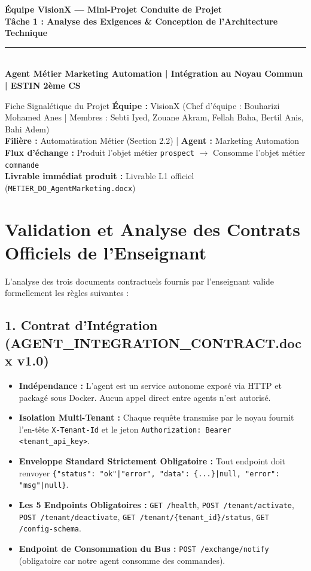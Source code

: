 \documentclass[11pt,a4paper]{article}
\begin{document}
\begin{center}
    {\LARGE \textbf{\color{primary}Équipe VisionX — Mini-Projet Conduite de Projet}}\\[0.15cm]
    {\large \textbf{\color{secondary}Tâche 1 : Analyse des Exigences \& Conception de l'Architecture Technique}}\\[0.2cm]
    \rule{0.85\textwidth}{0.8pt}\\[0.15cm]
    {\footnotesize \textbf{Agent Métier Marketing Automation | Intégration au Noyau Commun | ESTIN 2ème CS}}
\end{center}
\vspace{-0.2cm}

\begin{infobox}{Fiche Signalétique du Projet}
\textbf{Équipe :} VisionX (Chef d'équipe : Bouharizi Mohamed Anes | Membres : Sebti Iyed, Zouane Akram, Fellah Baha, Bertil Anis, Bahi Adem)\\
\textbf{Filière :} Automatisation Métier (Section 2.2) | \textbf{Agent :} Marketing Automation\\
\textbf{Flux d'échange :} Produit l'objet métier \texttt{prospect} $\longrightarrow$ Consomme l'objet métier \texttt{commande}\\
\textbf{Livrable immédiat produit :} Livrable L1 officiel (\texttt{METIER\_DO\_AgentMarketing.docx})
\end{infobox}

\section{Validation et Analyse des Contrats Officiels de l'Enseignant}
L'analyse des trois documents contractuels fournis par l'enseignant valide formellement les règles suivantes :

\subsection{1. Contrat d'Intégration (AGENT\_INTEGRATION\_CONTRACT.docx v1.0)}
\begin{itemize}[leftmargin=*, itemsep=1.5pt]
    \item \textbf{Indépendance :} L'agent est un service autonome exposé via HTTP et packagé sous Docker. Aucun appel direct entre agents n'est autorisé.
    \item \textbf{Isolation Multi-Tenant :} Chaque requête transmise par le noyau fournit l'en-tête \texttt{X-Tenant-Id} et le jeton \texttt{Authorization: Bearer <tenant\_api\_key>}.
    \item \textbf{Enveloppe Standard Strictement Obligatoire :} Tout endpoint doit renvoyer \texttt{\{"status": "ok"|"error", "data": \{...\}|null, "error": "msg"|null\}}.
    \item \textbf{Les 5 Endpoints Obligatoires :} \texttt{GET /health}, \texttt{POST /tenant/activate}, \texttt{POST /tenant/deactivate}, \texttt{GET /tenant/\{tenant\_id\}/status}, \texttt{GET /config-schema}.
    \item \textbf{Endpoint de Consommation du Bus :} \texttt{POST /exchange/notify} (obligatoire car notre agent consomme des commandes).
\end{itemize}
\end{document}
